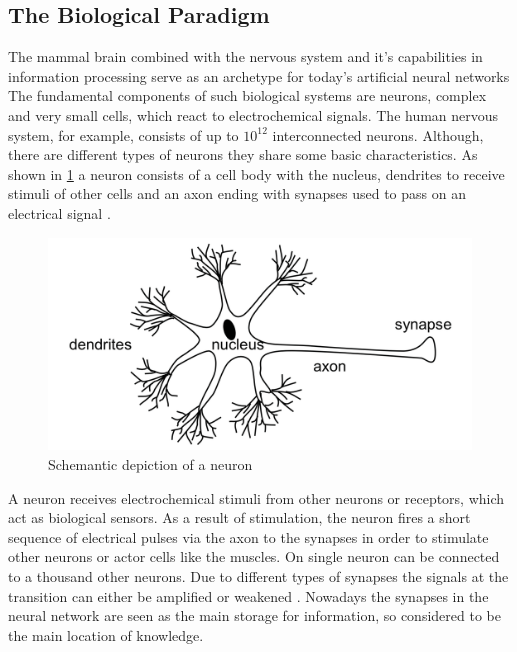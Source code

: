 \documentclass[12pt,a4paper]{article}
\begin{document}
\subsection{The Biological Paradigm}
The mammal brain combined with the nervous system and it's capabilities in information processing serve as an archetype for today's artificial neural networks\cite{Rojas1996}
The fundamental components of such biological systems are neurons, complex and very small cells, which react to electrochemical signals.
The human nervous system, for example, consists of up to $10^{12}$ interconnected neurons.
Although, there are different types of neurons they share some basic characteristics. As shown in \ref{fig:neuron_schemantic} a neuron consists of a cell body with the nucleus, dendrites to receive stimuli of other cells and an axon ending with synapses used to pass on an electrical signal \cite{Patterson1997}.
\begin{figure}
    \centering
    \includegraphics[width=0.5\linewidth]{Figures/Neuron_schemantic_depiction.png}
    \caption{Schemantic depiction of a neuron}
    \label{fig:neuron_schemantic}
\end{figure}
A neuron receives electrochemical stimuli from other neurons or receptors, which act as biological sensors.
As a result of stimulation, the neuron fires a short sequence of electrical pulses via the axon to the synapses in order to stimulate other neurons or actor cells like the muscles. On single neuron can be connected to a thousand other neurons. Due to different types of synapses the signals at the transition can either be amplified or weakened \cite{Patterson1997}.
Nowadays the synapses in the neural network are seen as the main storage for information, so considered to be the main location of knowledge\cite{Rojas1996}.
\end{document}
